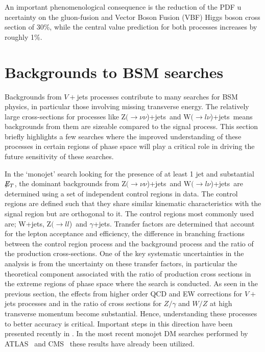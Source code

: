 \documentclass[a4paper,11pt,notoc]{article}
\newcommand{\Zll}   {\mbox{${\mathrm Z}(\rightarrow l l$)}}
\newcommand{\Znunuj}   {\mbox{${\mathrm Z}(\rightarrow\nu \nu$)+jets}}
\newcommand{\Wlnuj}   {\mbox{${\mathrm W}(\rightarrow l\nu$)+jets}}
\newcommand{\met}{\ensuremath{\not\!\!E_T}}
\begin{document}
%
An important phenomenological consequence is the reduction of the PDF u
ncertainty on the  gluon-fusion  and Vector Boson 
Fusion (VBF) Higgs boson cross section of 30\%, while the central value 
prediction for both processes increases by roughly 1\%.

\section{Backgrounds to BSM searches}
Backgrounds from $V+$jets processes contribute to many searches for BSM physics, in particular those involving missing transverse energy. The relatively large cross-sections for processes like \Znunuj\ and \Wlnuj\ means backgrounds from them are sizeable compared to the signal process. This section briefly highlights a few searches where the improved understanding of these processes in certain regions of phase space will play a critical role in driving the future sensitivity of these searches. 

In the `monojet' search looking for the presence of at least 1 jet and substantial \met, the dominant backgrounds from \Znunuj\ and \Wlnuj\ are determined using a set of independent control regions in data. The control regions are defined such that they share similar kinematic characteristics with the signal region but are orthogonal to it. The control regions most commonly used are; W+jets, \Zll\ and $\gamma$+jets. Transfer factors are determined that account for the lepton acceptance and efficiency, the difference in branching fractions between the control region process and the background process and the ratio of the production cross-sections. One of the key systematic uncertainties in the analysis is from the uncertainty on these transfer factors, in particular the theoretical component associated with the ratio of production cross sections in the extreme regions of phase space where the search is conducted. As seen in the previous section, the effects from higher order QCD and EW corrections for $V+$jets processes and in the ratio of cross sections for $Z/\gamma$ and $W/Z$ at high transverse momentum become substantial. Hence, understanding these processes to better accuracy is critical. Important steps in this direction
have been presented recently in \cite{Lindert:2017olm}. In the most recent monojet DM searches performed by ATLAS~\cite{ATLAS:2017dnw} and CMS~\cite{CMS:2017tbk} these results have already been utilized.
\end{document}
